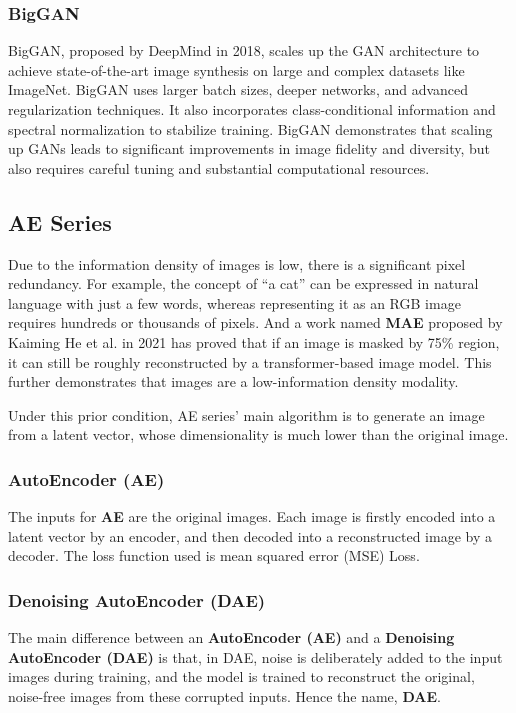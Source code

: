 \documentclass{article}
\begin{document}
\subsubsection{BigGAN}
BigGAN, proposed by DeepMind in 2018, scales up the GAN architecture to achieve state-of-the-art image synthesis on large and complex datasets like ImageNet. BigGAN uses larger batch sizes, deeper networks, and advanced regularization techniques. It also incorporates class-conditional information and spectral normalization to stabilize training. BigGAN demonstrates that scaling up GANs leads to significant improvements in image fidelity and diversity, but also requires careful tuning and substantial computational resources.

\subsection{AE Series}

Due to the information density of images is low, there is a significant pixel redundancy. For example, the 
concept of ``a cat'' can be expressed in natural language with just a few words, whereas representing it as 
an RGB image requires hundreds or thousands of pixels. And a work named \textbf{MAE} proposed by Kaiming He 
et al. in 2021 has proved that if an image is masked by 75\% region, it can still be roughly reconstructed 
by a transformer-based image model. This further demonstrates that images are a low-information density 
modality.

Under this prior condition, AE series' main algorithm is to generate an image from a latent vector, whose 
dimensionality is much lower than the original image.

\subsubsection{AutoEncoder (AE)}

The inputs for \textbf{AE} are the original images. Each image is firstly encoded into a latent vector by an 
encoder, and then decoded into a reconstructed image by a decoder. The loss function used is mean squared 
error (MSE) Loss.

\subsubsection{Denoising AutoEncoder (DAE)}

The main difference between an \textbf{AutoEncoder (AE)} and a \textbf{Denoising AutoEncoder (DAE)} is that, 
in DAE, noise is deliberately added to the input images during training, and the model is trained to 
reconstruct the original, noise-free images from these corrupted inputs. Hence the name, \textbf{DAE}.
\end{document}
